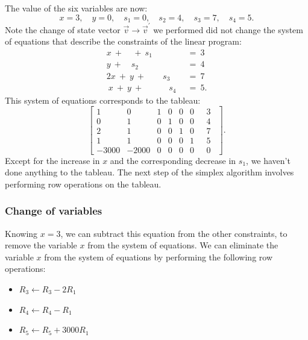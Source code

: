 \documentclass[11pt,oneside]{article}
\begin{document}
		The value of the six variables are now:
		\[
			x=3, \quad y=0, \quad s_1=0, \quad s_2=4,  \quad s_3=7, \quad s_4=5.
		\]
		Note the change of state vector $\vec{v} \to \vec{v}^\prime$ we performed did not change the 
		system of equations that describe the constraints of the linear program:
		\[		
			\begin{array}{rl}
					x \ + \ \ \ \ \ + \ s_1 \quad \quad \quad	\ &=	\ 3	\\
					          y \ + \quad s_2 \quad \quad 		\ &= 	\ 4	\\
					2x \ + \ y \ + \quad \quad  s_3 \quad 		\ &= 	\ 7	\\
					 \ x \ + \ y \ + \quad \quad \quad  s_4   		\ &= 	\ 5.	
			\end{array}
		\]			
		This system of equations corresponds to the tableau:
		\[
			\left[
			\begin{array}{rrrrrr|r}
				    1&     0& 1& 0& 0& 0 \ \ & \ 3    \  \   \\ 
				    0&     1& 0& 1& 0& 0 \ \ & \  4    \  \   \\ 
				    2&     1& 0& 0& 1& 0 \ \ & \  7    \  \   \\ 
				    1&     1& 0& 0& 0& 1\ \ & \  5      \  \ \\ 
				-3000& -2000& 0& 0& 0& 0 \ \ & \  0      \  \ 
			\end{array}
			\right].
		\]
		Except for the increase in $x$ and the corresponding decrease in $s_1$,
		we haven't done anything to the tableau.
		The next step of the simplex algorithm involves performing row operations on the tableau.
		
	\subsubsection{Change of variables}
		
		Knowing $x=3$, we can subtract this equation from the other constraints,
		to remove the variable $x$ from the system of equations.
		We can eliminate the variable $x$ from the system of equations 
		by performing the following row operations:
		\begin{itemize}
			\item $R_3 \gets R_3 - 2R_1$
			\item $R_4 \gets R_4 - R_1$
			\item $R_5 \gets R_5 + 3000R_1$
		\end{itemize}
		
\end{document}
